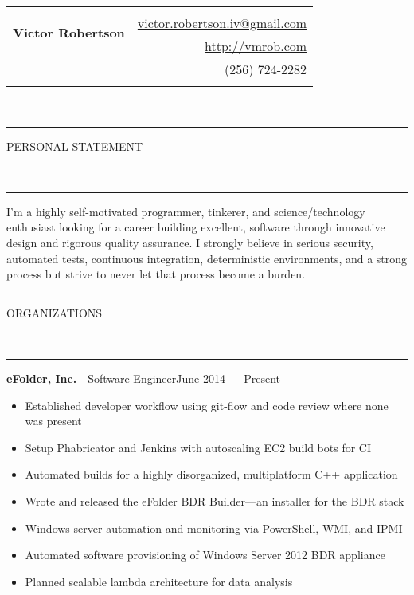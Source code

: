 \documentclass[10pt, letterpaper, oneside]{article}
\makeatletter
\newcommand{\name}{Victor Robertson}
\newcommand{\website}{\href{http://vmrob.com}{http://vmrob.com}}
\newcommand{\phone}{(256) 724-2282}
\newcommand{\email}{\href{mailto:victor.robertson.iv@gmail.com}{victor.robertson.iv@gmail.com}}
\newcommand{\HRule}[2]{\textcolor{#1}{\rule{\linewidth}{#2}}}
\newcommand{\sectiontitle}[1]{\begin{minipage}{\textwidth}\HRule{black}{0.25mm}\vspace{-10pt}\begin{center}\Large\MakeUppercase{#1}\end{center}\end{minipage}\\\HRule{light-grey}{0.15mm}\vspace{\baselineskip}}
\newenvironment{ressection}[1]{
  \sectiontitle{#1}}
  {\vspace{0.5\baselineskip}}
\newcommand{\resitem}[1]{
    \vspace{2pt}
    \item \begin{flushleft} #1 \end{flushleft}
}
\newcommand{\resentryheader}[3]{
    \vspace{-5pt}
    \textbf{#1} - #2\hspace{\stretch{1}}\textcolor{light-grey}{#3}\\
}
\newenvironment{resentry}[3]{
  \begin{minipage}{\textwidth}
    \resentryheader{#1}{#2}{#3}
        \vspace{-\baselineskip}
    \begin{itemize}[noitemsep,nolistsep]
}{
    \end{itemize}
        \vspace{\baselineskip}
        \end{minipage}
}
\makeatother
\begin{document}
\begin{tabularx}{\linewidth}{X r}
\multirow{3}{*}{\Huge\textbf{\name}} & \\& \email \\& \website \\& \phone \\\\
\end{tabularx}\\

\begin{ressection}{Personal Statement}
    I'm a highly self-motivated programmer, tinkerer, and science/technology enthusiast looking for a career building excellent, software through innovative design and rigorous quality assurance. I strongly believe in serious security, automated tests, continuous integration, deterministic environments, and a strong process but strive to never let that process become a burden.\\
\end{ressection}

\begin{ressection}{Organizations}
  \begin{resentry}{eFolder, Inc.}{Software Engineer}{June 2014 --- Present}
    \resitem{Established developer workflow using git-flow and code review where none was present}
    \resitem{Setup Phabricator and Jenkins with autoscaling EC2 build bots for CI}
    \resitem{Automated builds for a highly disorganized, multiplatform C++ application}
    \resitem{Wrote and released the eFolder BDR Builder---an installer for the BDR stack}
    \resitem{Windows server automation and monitoring via PowerShell, WMI, and IPMI}
    \resitem{Automated software provisioning of Windows Server 2012 BDR appliance}
    \resitem{Planned scalable lambda architecture for data analysis}
  \end{resentry}
\end{ressection}
\end{document}
